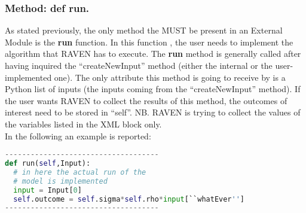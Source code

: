 \subsubsection{Method: def run.}
\label{subsubsec:externalRun}
As stated previously, the only method the MUST be present in an External Module
is the \textbf{run} function.
%
In this function , the user needs to implement the algorithm that RAVEN has to
execute.
%
The \textbf{run} method is generally called after having inquired the
``createNewInput'' method (either the internal or the user-implemented one).
%
The only attribute this method is going to receive by is a Python list of inputs
(the inputs coming from the ``createNewInput'' method).
%
If the user wants RAVEN to collect the results of this method, the outcomes of
interest need to be stored in ``self''.
%
NB.
%
RAVEN is trying to collect the values of the variables listed in the XML block
 only.
%
\\In the following an example is reported:

\begin{lstlisting}[language=python]
------------------------------------
def run(self,Input):
  # in here the actual run of the
  # model is implemented
  input = Input[0]
  self.outcome = self.sigma*self.rho*input[``whatEver'']
------------------------------------
\end{lstlisting}

%


